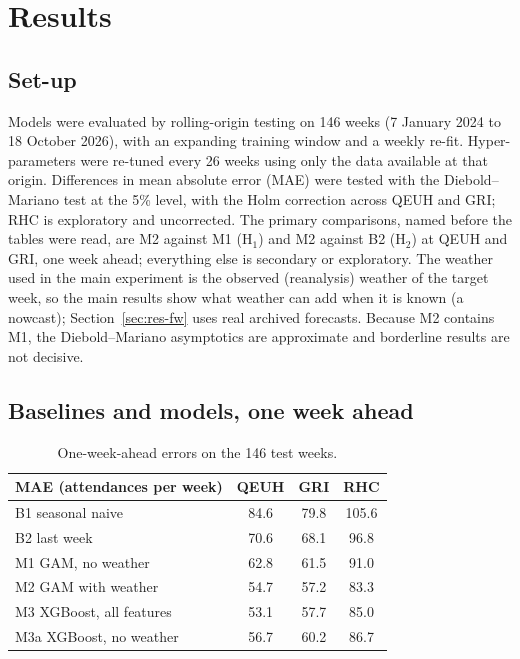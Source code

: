 
\section{Results}\label{sec:results}

\subsection{Set-up}
Models were evaluated by rolling-origin testing on 146 weeks (7 January 2024 to 18 October 2026), with an expanding training window and a weekly re-fit. Hyper-parameters were re-tuned every 26 weeks using only the data available at that origin. Differences in mean absolute error (MAE) were tested with the Diebold--Mariano test \parencite{diebold1995} at the 5\% level, with the Holm correction across QEUH and GRI; RHC is exploratory and uncorrected. The primary comparisons, named before the tables were read, are M2 against M1 (H$_1$) and M2 against B2 (H$_2$) at QEUH and GRI, one week ahead; everything else is secondary or exploratory. The weather used in the main experiment is the observed (reanalysis) weather of the target week, so the main results show what weather can add when it is known (a nowcast); Section~\ref{sec:res-fw} uses real archived forecasts. Because M2 contains M1, the Diebold--Mariano asymptotics are approximate and borderline results are not decisive.

\subsection{Baselines and models, one week ahead}
\begin{table}[h!]
\centering\small
\begin{tabular}{lccc}
\hline
MAE (attendances per week) & QEUH & GRI & RHC \\
\hline
B1 seasonal naive & 84.6 & 79.8 & 105.6 \\
B2 last week & 70.6 & 68.1 & 96.8 \\
M1 GAM, no weather & 62.8 & 61.5 & 91.0 \\
M2 GAM with weather & 54.7 & 57.2 & 83.3 \\
M3 XGBoost, all features & 53.1 & 57.7 & 85.0 \\
M3a XGBoost, no weather & 56.7 & 60.2 & 86.7 \\
\hline
\end{tabular}
\caption{One-week-ahead errors on the 146 test weeks.}
\label{table:res-main}
\end{table}

